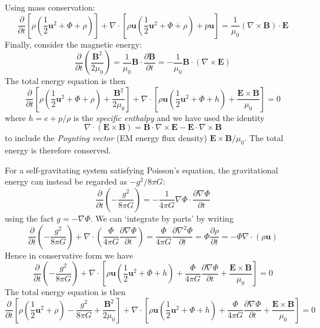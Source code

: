 \documentclass{jknotes}
\newcommand{\B}{\symbf{B}}
\renewcommand{\u}{\symbf{u}}
\begin{document}
Using mass conservation:
\begin{equation}
	\frac{\partial}{\partial t} \left[ \rho (\frac{1}{2}\u^2 + \Phi +
	\rho)\right] + \nabla \cdot \left[ \rho \u (\frac{1}{2}\u^2 + \Phi + \rho)
	+ p \u\right] = \frac{1}{\mu_0} (\nabla \times \B) \cdot \symbf{E}
\end{equation}
Finally, consider the magnetic energy:
\begin{equation}
	\frac{\partial}{\partial t} \left( \frac{\B^2}{2\mu_0}\right) =
	\frac{1}{\mu_0} \B \cdot \frac{\partial \B}{\partial t} = -
	\frac{1}{\mu_0} \B \cdot (\nabla \times \symbf{E})
\end{equation}
The total energy equation is then
\begin{equation}
	\frac{\partial}{\partial t} \left[ \rho (\frac{1}{2}\u^2 + \Phi +
	\rho) + \frac{\B^2}{2\mu_0} \right] + \nabla \cdot \left[ \rho \u
	(\frac{1}{2}\u^2 + \Phi + h) + \frac{\symbf{E}\times\B}{\mu_0}\right] = 0
\end{equation}
where $h = e + p/\rho$ is the \emph{specific enthalpy} and we have used the
identity
\begin{equation}
	\nabla \cdot (\symbf{E} \times \B) = \B \cdot \nabla \times \symbf{E} -
	\symbf{E} \cdot \nabla \times \B
\end{equation}
to include the \emph{Poynting vector} (EM energy flux density)
$\symbf{E}\times \B / \mu_0$. The total energy is therefore conserved.

For a self-gravitating system satisfying Poisson's equation, the gravitational
energy can instead be regarded as $-g^2/8\pi G$:
\begin{equation}
	\frac{\partial}{\partial t}\left( -\frac{g^2}{8\pi G}\right) =
	-\frac{1}{4\pi G} \nabla \Phi \cdot \frac{\partial \nabla \Phi}{\partial
	t}
\end{equation}
using the fact $g = - \nabla \Phi$. We can `integrate by parts' by writing
\begin{equation}
	\frac{\partial}{\partial t} \left( - \frac{g^2}{8\pi G}\right) + \nabla
	\cdot \left( \frac{\Phi}{4\pi G} \frac{\partial \nabla \Phi}{\partial t}
	\right) = \frac{\Phi}{4\pi G} \frac{\partial \nabla^2 \Phi}{\partial t} =
	\Phi \frac{\partial \rho}{\partial t} = - \Phi \nabla \cdot (\rho \u)
\end{equation}
Hence in conservative form we have
\begin{equation}
	\frac{\partial}{\partial t} \left( - \frac{g^2}{8\pi G}\right) +
	\nabla\cdot \left[ \rho \u(\frac{1}{2}\u^2 + \Phi + h) + \frac{\Phi}{4\pi
		G} \frac{\partial \nabla \Phi}{\partial t} + \frac{\symbf{E} \times
	\B}{\mu_0} \right] = 0
\end{equation}
The total energy equation is then
\begin{equation}
	\frac{\partial}{\partial t} \left[ \rho (\frac{1}{2}\u^2 + \rho) -
	\frac{g^2}{8\pi G} + \frac{\B^2}{2\mu_0} \right] + \nabla \cdot \left[ \rho \u
	(\frac{1}{2}\u^2 + \Phi + h) + \frac{\Phi}{4\pi G} \frac{\partial \nabla
	\Phi}{\partial t} + \frac{\symbf{E}\times\B}{\mu_0}\right] = 0
\end{equation}
\end{document}
